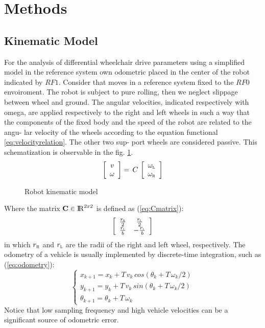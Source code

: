 \section{Methods}
\subsection{Kinematic Model}
For the analysis of differential wheelchair drive parameters using a simplified model in the reference system own odometric placed in the center of the robot indicated by $RF1$. Consider that moves in a reference system fixed to the $RF0$ envoiroment. The robot is subject to pure rolling, then we neglect slippage between wheel and ground. The angular velocities, indicated respectively with omega, are applied respectively to the right and left wheels in such a way that the components of the fixed body and the speed of the robot are related to the angu- lar velocity of the wheels according to the equation functional \ref{eq:velocityrelation}. The other two sup- port wheels are considered passive. This schematization is observable in the fig. \ref{fig:model}.
\begin{equation}
\label{eq:velocityrelation}
	\left[ \begin{array}{cc}
				v	\\									
				\omega 							
			 \end{array} 
	\right]  =\, C\,
	\left[ \begin{array}{cc}
 				\omega_\textsc{l} \\ 
				\omega_\textsc{r}
			 \end{array} 
	\right]
\end{equation}

\begin{figure}[!h]
\centering
    \resizebox{.8\linewidth}{!}{}
\caption{Robot kinematic model}
\label{fig:model}
\end{figure}
\noindent Where the matrix $\textbf{C} \in \operatorname{\rm I\!R}^{2 x 2}$ is defined as (\ref{eq:Cmatrix}):
\begin{equation}
\label{eq:Cmatrix}
	\left[ \begin{array}{cc}
 				\frac{r_\textsc{r}}{2} &	\frac{r_\textsc{l}}{2} \\
				\frac{r_\textsc{l}}{b} &	-\frac{r_\textsc{l}}{b} 
			 \end{array} 
	\right]
\end{equation}
in which $r_\textsc{r}$ and $r_\textsc{l}$ are the radii of the right and left wheel, respectively.
The odometry of a vehicle is usually implemented by discrete-time integration, such as (\ref{eq:odometry}):
\begin{equation}
\label{eq:odometry}
	\begin{cases}
		x_{k+1} = x_{k} + T \, v_{k} \, cos(\theta_{k} + T \,\omega_{k}/2)\\
		y_{k+1} = y_{k} + T \, v_{k} \, sin(\theta_{k} + T \, \omega_{k}/2)\\
		\theta_{k+1} = \theta_{k} + T \, \omega_{k}
	\end{cases}
\end{equation}           
Notice that low sampling frequency and high vehicle velocities can be a significant source of odometric error.

